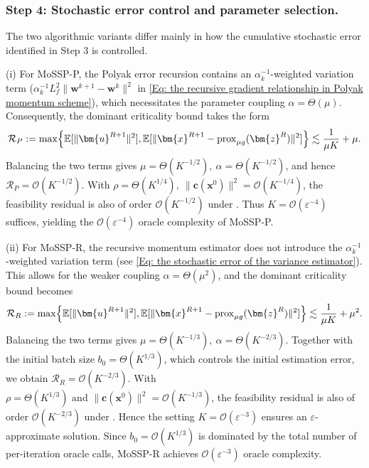 \documentclass{article}
\theoremstyle{plain}
\theoremstyle{definition}
\theoremstyle{remark}
\newcommand{\EE}{\mathbb{E}}
\newcommand{\prox}{\mathrm{prox}}
\newcommand{\bx}{\bm{x}}
\newcommand{\bc}{\bm{c}}
\newcommand{\bu}{\bm{u}}
\newcommand{\bz}{\bm{z}}
\newcommand{\calO}{\mathcal{O}}
\newcommand{\bw}{\bm{w}}
\numberwithin{equation}{section}
\begin{document}
\subsubsection*{Step 4: Stochastic error control and parameter selection.}
The two algorithmic variants differ mainly in how the cumulative stochastic error identified in Step 3 is controlled.

(i) For MoSSP-P, the Polyak error recursion contains an \(\alpha_k^{-1}\)-weighted variation term ($\alpha_k^{-1}L_f^2\| \bw^{k+1} - \bw^k\|^2$ in \eqref{Eq: the recursive gradient relationship in Polyak momentum scheme}), which necessitates the parameter coupling \(\alpha=\Theta(\mu)\). Consequently, the dominant criticality bound takes the form
\[
    \mathcal R_P := \max\Bigl\{ \EE[\|\bu^{R+1}\|^2], \EE[\|\bx^{R+1}-\prox_{\mu g}(\bz^R)\|^2] \Bigr\} \lesssim \frac{1}{\mu K}+\mu .
\]
Balancing the two terms gives \(\mu=\Theta(K^{-1/2}),\ \alpha=\Theta(K^{-1/2})\), and hence \(\mathcal R_P=\calO(K^{-1/2})\). With \(\rho=\Theta(K^{1/4}),\ \|\bc(\bx^0)\|^2=\calO(K^{-1/4})\), the feasibility residual is also of order \(\calO(K^{-1/2})\) under . Thus \(K=\calO(\varepsilon^{-4})\) suffices, yielding the \(\calO(\varepsilon^{-4})\) oracle complexity of MoSSP-P.

(ii) For MoSSP-R, the recursive momentum estimator does not introduce the \(\alpha_k^{-1}\)-weighted variation term (see \eqref{Eq: the stochastic error of the variance estimator}). This allows for the weaker coupling \(\alpha=\Theta(\mu^2)\), and the dominant criticality bound becomes
\[
    \mathcal R_R := \max\Bigl\{ \EE[\|\bu^{R+1}\|^2], \EE[\|\bx^{R+1}-\prox_{\mu g}(\bz^R)\|^2] \Bigr\} \lesssim \frac{1}{\mu K}+\mu^2 .
\]
Balancing the two terms gives \(\mu=\Theta(K^{-1/3}),\ \alpha=\Theta(K^{-2/3})\). Together with the initial batch size \(b_0=\Theta(K^{1/3})\), which controls the initial estimation error, we obtain \(\mathcal R_R=\calO(K^{-2/3})\). With \(\rho=\Theta(K^{1/3}) \mbox{ and } \|\bc(\bx^0)\|^2=\calO(K^{-1/3})\), the feasibility residual is also of order \(\calO(K^{-2/3})\) under . Hence the setting \(K=\calO(\varepsilon^{-3})\) ensures an $\varepsilon$-approximate solution. Since \(b_0=\calO(K^{1/3})\) is dominated by the total number of per-iteration oracle calls, MoSSP-R achieves \(\calO(\varepsilon^{-3})\) oracle complexity.
\end{document}
